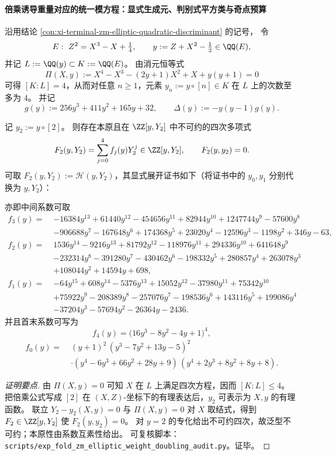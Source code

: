 \paragraph{倍乘诱导重量对应的统一模方程：显式生成元、判别式平方类与奇点预算}
沿用结论 \ref{con:xi-terminal-zm-elliptic-quadratic-discriminant} 的记号，
令
\[
E:\ Z^{2}=X^{3}-X+\tfrac14,\qquad
y:=Z+X^{2}-\tfrac12\in\QQ(E),
\]
并记 \(L:=\QQ(y)\subset K:=\QQ(E)\)。
由消元恒等式
\[
\Pi(X,y):=X^{4}-X^{3}-(2y+1)X^{2}+X+y(y+1)=0
\]
可得 \([K:L]=4\)，从而对任意 \(n\ge 1\)，元素 \(y_n:=y\circ[n]\in K\) 在 \(L\) 上的次数至多为 \(4\)。
并记
\[
g(y):=256y^3+411y^2+165y+32,\qquad
\Delta(y):=-y(y-1)g(y).
\]

\begin{conclusion}\label{con:xi-terminal-zm-elliptic-weight-modular-equation-double-explicit}
记 \(y_2:=y\circ[2]\)。
则存在本原且在 \(\ZZ[y,Y_2]\) 中不可约的四次多项式
\[
F_2(y,Y_2)=\sum_{j=0}^{4}f_j(y)Y_2^j\in\ZZ[y,Y_2],
\qquad
F_2(y,y_2)=0.
\]
可取 \(F_2(y,Y_2):=\mathcal{H}(y,Y_2)\)，其显式展开证书如下（将证书中的 \(y_0,y_1\) 分别代换为 \(y,Y_2\)）：

亦即中间系数可取
\[
\begin{aligned}
f_3(y)=\;&-16384y^{13}+61440y^{12}-454656y^{11}+82944y^{10}+1247744y^{9}-57600y^{8}\\
&-906688y^{7}-167648y^{6}+174368y^{5}+23020y^{4}-12596y^{3}-1198y^{2}+346y-63,\\[1mm]
f_2(y)=\;&1536y^{14}-9216y^{13}+81792y^{12}-118976y^{11}+294336y^{10}+641648y^{9}\\
&-232314y^{8}-391280y^{7}-430462y^{6}-198332y^{5}+280857y^{4}+263078y^{3}\\
&+108044y^{2}+14594y+698,\\[1mm]
f_1(y)=\;&-64y^{15}+608y^{14}-5376y^{13}+15052y^{12}-37980y^{11}+75342y^{10}\\
&+75922y^{9}-208389y^{8}-257076y^{7}-198536y^{6}+143116y^{5}+199086y^{4}\\
&-37204y^{3}-57694y^{2}-26364y-2436.
\end{aligned}
\]
并且首末系数可写为
\[
f_4(y)=\bigl(16y^{3}-8y^{2}-4y+1\bigr)^{4},
\]
\[
\begin{aligned}
f_0(y)=\;&(y+1)^2\,(y^3-7y^2+13y-5)^2\\
&\cdot (y^4-6y^3+66y^2+28y+9)\,(y^4+2y^3+8y^2+8y+8).
\end{aligned}
\]
\end{conclusion}
\begin{proof}[证明要点]
由 \(\Pi(X,y)=0\) 可知 \(X\) 在 \(L\) 上满足四次方程，因而 \([K:L]\le 4\)。
把倍乘公式写成 \([2]\) 在 \((X,Z)\)-坐标下的有理表达后，\(y_2\) 可表示为 \(X,y\) 的有理函数。
联立 \(Y_2-y_2(X,y)=0\) 与 \(\Pi(X,y)=0\) 对 \(X\) 取结式，得到 \(F_2\in\ZZ[y,Y_2]\) 使 \(F_2(y,y_2)=0\)。
对 \(y=2\) 的专化给出不可约四次，故泛型不可约；本原性由系数互素性给出。
可复核脚本：\texttt{scripts/exp\_fold\_zm\_elliptic\_weight\_doubling\_audit.py}。证毕。
\end{proof}

